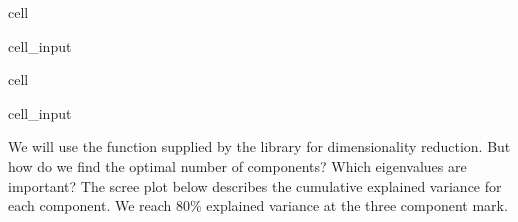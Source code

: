 \documentclass[letterpaper,10pt,english]{jupyterBook}
\begin{document}
\begin{sphinxuseclass}{cell}\begin{sphinxVerbatimInput}

\begin{sphinxuseclass}{cell_input}
\begin{sphinxVerbatim}[commandchars=\\\{\}]
\PYG{p}{[}
    \PYG{p}{[}    \PYG{p}{]}
    \PYG{p}{]}  \PYG{p}{[}\PYG{p}{[}    \PYG{p}{]}\PYG{p}{]}
\end{sphinxVerbatim}

\end{sphinxuseclass}\end{sphinxVerbatimInput}

\end{sphinxuseclass}
\begin{sphinxuseclass}{cell}\begin{sphinxVerbatimInput}

\begin{sphinxuseclass}{cell_input}
\begin{sphinxVerbatim}[commandchars=\\\{\}]
 
\end{sphinxVerbatim}

\end{sphinxuseclass}\end{sphinxVerbatimInput}

\end{sphinxuseclass}
\sphinxAtStartPar
We will use the  function supplied by the  library for dimensionality reduction.  But how do we find the optimal number of components? Which eigenvalues are important?  The scree plot below describes the cumulative explained variance for each component. We reach 80\% explained variance at the three component mark.
\end{document}
